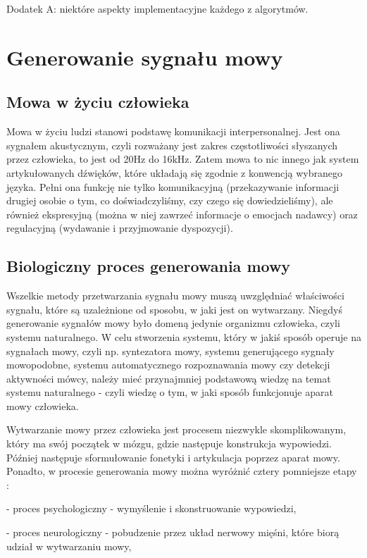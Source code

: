 \documentclass[eng,printmode]{mgr}
\begin{document}
Dodatek A: niektóre aspekty implementacyjne każdego z algorytmów.

\chapter{Generowanie sygnału mowy}
 \section{Mowa w życiu człowieka}
 
 Mowa w życiu ludzi stanowi podstawę komunikacji interpersonalnej. Jest ona sygnałem akustycznym, czyli rozważany jest zakres częstotliwości słyszanych przez człowieka, to jest od 20Hz do 16kHz. Zatem mowa to nic innego jak system artykułowanych dźwięków, które układają się zgodnie z konwencją wybranego języka. Pełni ona funkcję nie tylko komunikacyjną (przekazywanie informacji drugiej osobie o tym, co doświadczyliśmy, czy czego się dowiedzieliśmy), ale również ekspresyjną (można w niej zawrzeć informacje o emocjach nadawcy) oraz regulacyjną (wydawanie i przyjmowanie dyspozycji). 
 
 
 \section{Biologiczny proces generowania mowy}
 Wszelkie metody przetwarzania sygnału mowy muszą uwzględniać właściwości sygnału, które są uzależnione od sposobu, w jaki jest on wytwarzany. Niegdyś generowanie sygnałów mowy było domeną jedynie organizmu człowieka, czyli systemu naturalnego. W celu stworzenia systemu, który w jakiś sposób operuje na sygnałach mowy, czyli np. syntezatora mowy, systemu generującego sygnały mowopodobne, systemu automatycznego rozpoznawania mowy czy detekcji aktywności mówcy, należy mieć przynajmniej podstawową wiedzę na temat systemu naturalnego - czyli wiedzę o tym, w jaki sposób funkcjonuje aparat mowy człowieka.
 
 Wytwarzanie mowy przez człowieka jest procesem niezwykle skomplikowanym, który ma swój początek w mózgu, gdzie następuje konstrukcja wypowiedzi. Później następuje sformułowanie fonetyki i artykulacja poprzez aparat mowy. Ponadto, w procesie generowania mowy można wyróżnić cztery pomniejsze etapy \cite{Zemlin}:
	 
	 - proces psychologiczny - wymyślenie i skonstruowanie wypowiedzi,
	 
	 - proces neurologiczny - pobudzenie przez układ nerwowy mięśni, które biorą udział w wytwarzaniu mowy,
	 
\end{document}
